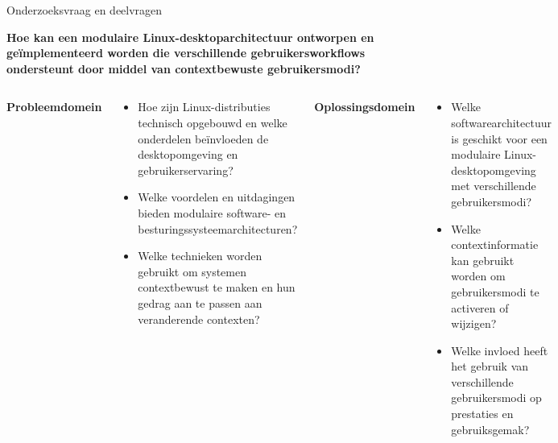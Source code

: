 \documentclass[aspectratio=169]{beamer}
\begin{document}
\begin{frame}[t]{Onderzoeksvraag en deelvragen}
    \vspace{+5pt}
    
    \begin{tcolorbox}[
        colback=colorfive,
        colframe=colorfive,
        coltext=white,
        before skip=0pt,
        after skip=0pt,
        boxrule=0pt,
        arc=2mm]
        \small \textbf{Hoe kan een modulaire Linux-desktoparchitectuur ontworpen en geïmplementeerd worden die verschillende gebruikersworkflows ondersteunt door middel van contextbewuste gebruikersmodi?}
    \end{tcolorbox}
    
    \begin{columns}[t,onlytextwidth] %
        \begin{tcolorbox}[columntitle]
            \textbf{Probleemdomein}
        \end{tcolorbox}
        \begin{tcolorbox}[columntext, left=0mm]
            \begin{itemize}[leftmargin=*]
                \item[] \scriptsize Hoe zijn Linux-distributies technisch opgebouwd en welke onderdelen beïnvloeden de desktopomgeving en gebruikerservaring?
                \item[] \scriptsize Welke voordelen en uitdagingen bieden modulaire software- en besturingssysteemarchitecturen?
                \item[] \scriptsize Welke technieken worden gebruikt om systemen contextbewust te maken en hun gedrag aan te passen aan veranderende contexten?
            \end{itemize}
        \end{tcolorbox}
        
        \begin{tcolorbox}[columntitle]
            \textbf{Oplossingsdomein}
        \end{tcolorbox}
        \begin{tcolorbox}[columntext, left=0mm]
            \begin{itemize}[leftmargin=*]
                \item[] \scriptsize Welke softwarearchitectuur is geschikt voor een modulaire Linux-desktopomgeving met verschillende gebruikersmodi?
                \item[] \scriptsize Welke contextinformatie kan gebruikt worden om gebruikersmodi te activeren of wijzigen?
                \item[] \scriptsize Welke invloed heeft het gebruik van verschillende gebruikersmodi op prestaties en gebruiksgemak?
            \end{itemize}
        \end{tcolorbox}
    \end{columns}
\end{frame}
\end{document}
